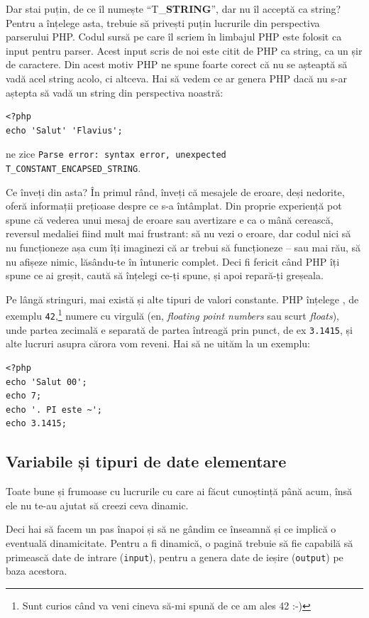 Dar stai puțin, de ce îl numește ``T\_\textbf{STRING}'', dar nu îl acceptă ca string?
Pentru a înțelege asta, trebuie să privești puțin lucrurile din perspectiva parserului
PHP. Codul sursă pe care îl scriem în limbajul PHP este folosit ca input pentru
parser. Acest input scris de noi este citit de PHP ca string, ca un șir de caractere.
Din acest motiv PHP ne spune foarte corect că nu se așteaptă să vadă acel string acolo,
ci altceva.
Hai să vedem ce ar genera PHP dacă nu s-ar aștepta să vadă un string
din perspectiva noastră:
\begin{lstlisting}
<?php
echo 'Salut' 'Flavius';
\end{lstlisting}
ne zice \texttt{Parse error: syntax error, unexpected T\_CONSTANT\_ENCAPSED\_STRING}.

Ce înveți din asta? În primul rând, înveți că mesajele de eroare, deși nedorite,
oferă informații prețioase despre ce s-a întâmplat. Din proprie experiență
pot spune că vederea unui mesaj de eroare sau avertizare e ca o mână cerească,
reversul medaliei fiind mult mai frustrant: să nu vezi o eroare, dar codul
nici să nu funcționeze așa cum îți imaginezi că ar trebui să funcționeze -- sau
mai rău, să nu afișeze nimic, lăsându-te în întuneric complet. Deci fi fericit
când PHP îți spune ce ai greșit, caută să înțelegi ce-ți spune, și apoi
repară-ți greșeala.

Pe lângă stringuri, mai există și alte tipuri de valori constante. PHP înțelege
, de exemplu \texttt{42},\footnote{Sunt curios
când va veni cineva să-mi spună de ce am ales 42 :-)}
numere cu virgulă (en, \textsl{floating point numbers} sau scurt \textsl{floats}),
unde partea zecimală
e separată de partea întreagă prin punct, de ex \texttt{3.1415}, și alte lucruri
asupra cărora vom reveni. Hai să ne uităm la un exemplu:
\begin{lstlisting}
<?php
echo 'Salut 00';
echo 7;
echo '. PI este ~';
echo 3.1415;
\end{lstlisting}

\subsection{Variabile și tipuri de date elementare}
Toate bune și frumoase cu lucrurile cu care ai făcut cunoștință
până acum, însă ele nu te-au ajutat să creezi ceva dinamic.

Deci hai să facem un pas înapoi și să ne gândim ce înseamnă și
ce implică o eventuală dinamicitate. Pentru a fi dinamică, o
pagină trebuie să fie capabilă să primească date de intrare (\texttt{input}),
pentru a genera date de ieșire (\texttt{output}) pe baza acestora.

